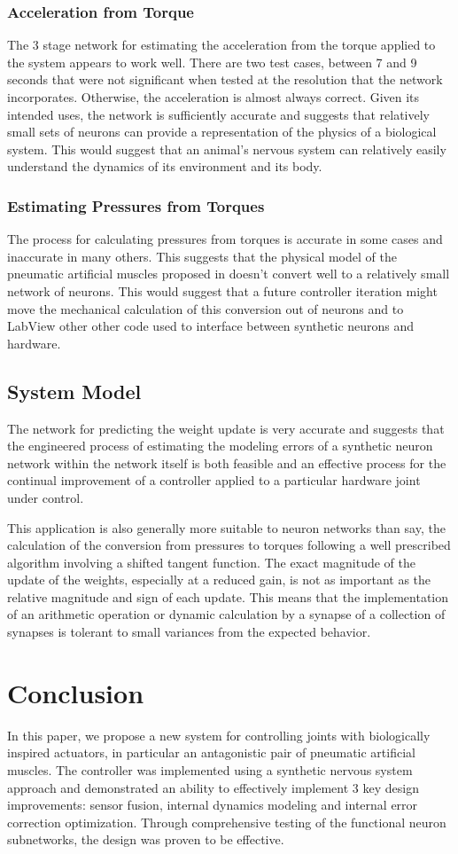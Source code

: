 \documentclass[letterpaper, 10 pt, conference]{IEEEconf} %
\newcommand{\bbs}[1]{\section{#1}}
\newcommand{\bbss}[1]{\subsection{#1}}
\newcommand{\bbsss}[1]{\subsubsection{#1}}
\begin{document}
\bbsss{Acceleration from Torque}

The 3 stage network for estimating the acceleration from the torque applied to 
the system appears to work well. There are two test cases, between 7 and 9 
seconds that were not significant when tested at the resolution that the 
network incorporates. Otherwise, the acceleration is almost always correct. 
Given its intended uses, the network is sufficiently accurate and suggests that 
relatively small sets of neurons can provide a representation of the physics of 
a biological system. This would suggest that an animal's nervous system can 
relatively easily understand the dynamics of its environment and its body.

\bbsss{Estimating Pressures from Torques}

The process for calculating pressures from torques is accurate in some
cases and inaccurate in many others. This suggests that the physical 
model of the pneumatic artificial muscles proposed in \cite{HuntPMuscles} 
doesn't convert well to a relatively small network of neurons. This would 
suggest that a future controller iteration might move the mechanical 
calculation of this conversion out of neurons and
to LabView other other code used to interface between synthetic neurons and 
hardware.

\bbss{System Model}

The network for predicting the weight update is very accurate and suggests that 
the engineered process of estimating the modeling errors of a synthetic neuron 
network within the network itself is both feasible and an effective process for 
the continual improvement of a controller applied to a particular hardware 
joint under control.

This application is also generally more suitable to neuron networks than say, 
the calculation of the conversion from pressures to torques following a well 
prescribed algorithm involving a shifted tangent function. The exact magnitude 
of the update of the weights, especially at a reduced gain, is not as important 
as the relative magnitude and sign of each update. This means that the 
implementation of an arithmetic operation or dynamic calculation by a synapse of 
a collection of synapses is tolerant to small variances from the expected 
behavior.

\bbs{Conclusion}
\label{chap:conclusion}


In this paper, we propose a new system for controlling joints with biologically inspired actuators, in particular an antagonistic pair of pneumatic artificial muscles. The controller was implemented using a synthetic nervous system approach and demonstrated an ability to effectively implement 3 key design improvements: sensor fusion, internal dynamics modeling and internal error correction optimization. Through comprehensive testing of the functional neuron subnetworks, the design was proven to be effective.
\end{document}

